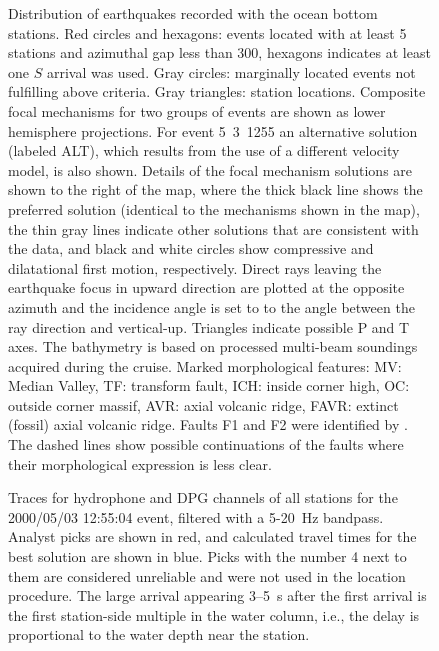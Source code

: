 \documentclass[jgr]{agu2001}
\renewcommand{\includefig}[2]{}
\newlength{\tw}
\begin{document}
\clearpage

\begin{figure}
\includefig{seismag-map/seismag-map}{39pc}%

\caption{Distribution of earthquakes recorded with the ocean bottom
stations.  Red circles and hexagons: events located with at least 5 stations and
azimuthal gap less than 300\dg, hexagons indicates at least one $S$
arrival was used. Gray circles: marginally located events not fulfilling above
criteria. Gray triangles: station locations.  Composite focal mechanisms for two
groups of events are shown as lower hemisphere projections.  
  For
event 5~3~1255 an alternative solution (labeled ALT), which results from
the use of a different velocity model, is also shown.  Details of the focal
mechanism solutions are shown to the right of the map, where the thick
black line shows the preferred solution (identical to the
mechanisms shown in the map), the thin gray lines indicate other
solutions that are consistent with the data, and black and white circles show
compressive and dilatational first motion, respectively. Direct rays
leaving the earthquake focus in upward direction are plotted at the
opposite azimuth and the incidence angle is set to to the angle
between the ray direction and vertical-up.  Triangles indicate possible P and T axes.  The bathymetry is
based on processed multi-beam soundings acquired during the cruise.
Marked morphological features: MV: Median Valley, TF: transform fault,
ICH: inside corner high, OC: outside corner massif, AVR: axial volcanic
ridge, FAVR: extinct (fossil) axial volcanic ridge. Faults F1 and F2 were identified by \citep{reston02}.  
The dashed lines show possible continuations of the faults where their morphological expression is 
less clear.}
\label{fig:seismag-map}
\end{figure}

\clearpage

\begin{figure}
\includefig{data-example/data-example}{20pc}%
\caption{Traces for hydrophone and DPG channels of all stations for the
2000/05/03 12:55:04 event, filtered with a 5-20~Hz bandpass.  
Analyst picks are shown in red, and calculated travel times for the
best solution are shown in blue.  Picks with the number 4 next to them
are considered unreliable and were not used in the location
procedure.  The large arrival appearing 3--5~s after the first arrival
is the first station-side multiple in the water column, i.e., the
delay is proportional to the water depth near the station.}
\label{fig:data-example}
\end{figure}
\end{document}

